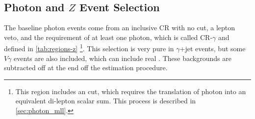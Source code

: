 
\subsection{Photon and $Z$ Event Selection}
\label{sec:photon_eventsel}

The baseline photon events come from an inclusive \ac{CR} with no \met cut, a lepton veto, and the requirement of at least one photon, which is called CR-$\gamma$ and defined in \autoref{tab:regions-z} \footnote{This region includes an \HT cut, which requires the translation of photon \pt into an equivalent di-lepton \pt scalar sum. This process is described in \autoref{sec:photon_mll}.}. This selection is very pure in $\gamma$+jet events, but some $V\gamma$ events are also included, which can include real \met. These backgrounds are subtracted off at the end off the estimation procedure. 

